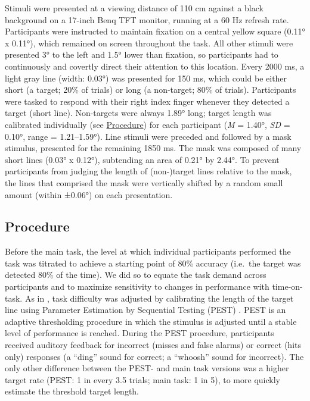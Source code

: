 \documentclass[11pt,english,]{memoir}
\begin{document}
Stimuli were presented at a viewing distance of 110 cm against a black background on a 17-inch Benq TFT monitor, running at a 60 Hz refresh rate. Participants were instructed to maintain fixation on a central yellow square (0.11° x 0.11°), which remained on screen throughout the task. All other stimuli were presented 3° to the left and 1.5° lower than fixation, so participants had to continuously and covertly direct their attention to this location. Every 2000 ms, a light gray line (width: 0.03°) was presented for 150 ms, which could be either short (a target; 20\% of trials) or long (a non-target; 80\% of trials). Participants were tasked to respond with their right index finger whenever they detected a target (short line). Non-targets were always 1.89° long; target length was calibrated individually (see \protect\hyperlink{procedure-1}{Procedure}) for each participant (\emph{M} = 1.40°, \emph{SD} = 0.10°, range = 1.21--1.59°). Line stimuli were preceded and followed by a mask stimulus, presented for the remaining 1850 ms. The mask was composed of many short lines (0.03° x 0.12°), subtending an area of 0.21° by 2.44°. To prevent participants from judging the length of (non-)target lines relative to the mask, the lines that comprised the mask were vertically shifted by a random small amount (within ±0.06°) on each presentation.

\hypertarget{procedure-1}{%
\subsection{Procedure}\label{procedure-1}}

Before the main task, the level at which individual participants performed the task was titrated to achieve a starting point of 80\% accuracy (i.e.~the target was detected 80\% of the time). We did so to equate the task demand across participants and to maximize sensitivity to changes in performance with time-on-task. As in \textcite{MacLean2009}, task difficulty was adjusted by calibrating the length of the target line using Parameter Estimation by Sequential Testing (PEST) \autocite{Taylor1967}. PEST is an adaptive thresholding procedure in which the stimulus is adjusted until a stable level of performance is reached. During the PEST procedure, participants received auditory feedback for incorrect (misses and false alarms) or correct (hits only) responses (a ``ding'' sound for correct; a ``whoosh'' sound for incorrect). The only other difference between the PEST- and main task versions was a higher target rate (PEST: 1 in every 3.5 trials; main task: 1 in 5), to more quickly estimate the threshold target length.
\end{document}
